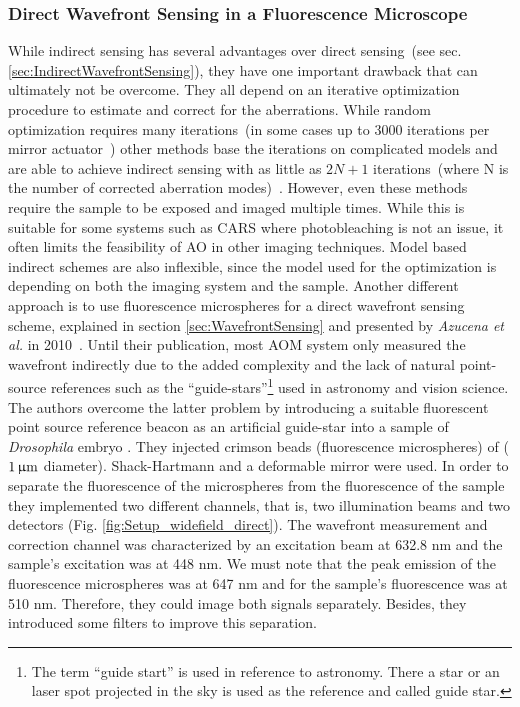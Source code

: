 \subsubsection{Direct Wavefront Sensing in a Fluorescence Microscope}
\label{sec:DirectFluorescenceMicroscope}

While indirect sensing has several advantages over direct sensing~(see sec. \ref{sec:IndirectWavefrontSensing}), they have one important drawback that can ultimately not be overcome. They all depend on an iterative optimization procedure to estimate and correct for the aberrations. While random optimization requires many iterations~(in some cases up to 3000 iterations per mirror actuator~\cite{scan_CARS}) other methods base the iterations on complicated models and are able to achieve indirect sensing with as little as $2N+1$ iterations~(where N is the number of corrected aberration modes)~\cite{wide_AOM_loew_freq,wide_AOM_structured_illu,scan_TPFM_image_based}. However, even these methods require the sample to be exposed and imaged multiple times. While this is suitable for some systems such as CARS where photobleaching is not an issue, it often limits the feasibility of AO in other imaging techniques. Model based indirect schemes are also inflexible, since the model used for the optimization is depending on both the imaging system and the sample. Another different approach is to use fluorescence microspheres for a direct wavefront sensing scheme, explained in section \ref{sec:WavefrontSensing} and presented by \emph{Azucena et al.} in 2010~\cite{wide_fluorescence_guide_star}. Until their publication, most AOM system only measured the wavefront indirectly due to the added complexity and the lack of natural point-source references such as the ``guide-stars''\footnote{The term ``guide start'' is used in reference to astronomy. There a star or an laser spot projected in the sky is used as the reference and called guide star.} used in astronomy and vision science. The authors overcome the latter problem by introducing a suitable fluorescent point source reference beacon as an artificial guide-star into a sample of \emph{Drosophila} embryo \cite{wide_directSensing_microscope}. They injected crimson beads (fluorescence microspheres) of ($\unit[1]{\upmu m}$ diameter). Shack-Hartmann and a deformable mirror were used. In order to separate the fluorescence of the microspheres from the fluorescence of the sample they implemented two different channels, that is, two illumination beams and two detectors (Fig. \ref{fig:Setup_widefield_direct}). The wavefront measurement and correction channel was characterized by an excitation beam at 632.8 nm and the sample's excitation was at 448 nm. We must note that the peak emission of the fluorescence microspheres was at 647 nm and for the sample's fluorescence was at 510 nm. Therefore, they could image both signals separately. Besides, they introduced some filters to improve this separation.

